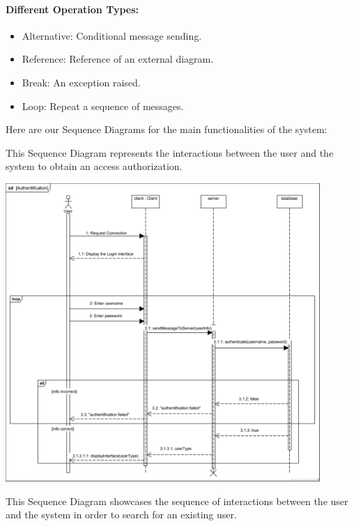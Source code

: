 \documentclass{article}
\begin{document}
\paragraph*{\textbf{Different Operation Types:}}
\begin{itemize}
    \item Alternative: Conditional message sending.
    \item Reference: Reference of an external diagram.
    \item Break: An exception raised.
    \item Loop: Repeat a sequence of messages.
\end{itemize}
\vspace{1cm}
\noindent Here are our Sequence Diagrams for the main functionalities of the system:


\newpage
This Sequence Diagram represents the interactions between the user and the system to obtain an access authorization.

\begin{center}
    \includegraphics[width=451px]{media/sequence diagrams/Authentification.png}
\end{center}

\newpage
This Sequence Diagram showcases the sequence of interactions between the user and the system in order to search for an existing user.
\end{document}
